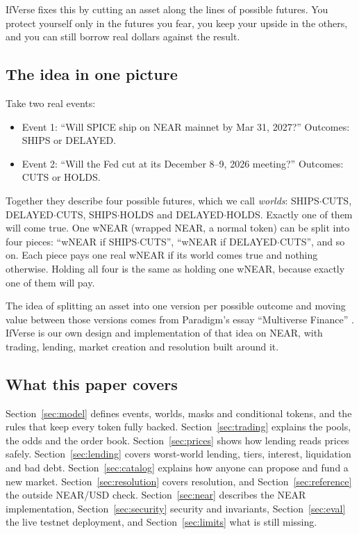 \documentclass[11pt,a4paper]{article}
\newcommand{\wSC}{\textsf{SHIPS$\cdot$CUTS}}
\newcommand{\wDC}{\textsf{DELAYED$\cdot$CUTS}}
\newcommand{\wSH}{\textsf{SHIPS$\cdot$HOLDS}}
\newcommand{\wDH}{\textsf{DELAYED$\cdot$HOLDS}}
\begin{document}
IfVerse fixes this by cutting an asset along the lines of possible futures. You protect yourself only in the futures
you fear, you keep your upside in the others, and you can still borrow real dollars against the result.

\subsection{The idea in one picture}

Take two real events:
\begin{itemize}
  \item Event 1: ``Will SPICE ship on NEAR mainnet by Mar 31, 2027?'' Outcomes: \textsf{SHIPS} or \textsf{DELAYED}.
  \item Event 2: ``Will the Fed cut at its December 8--9, 2026 meeting?'' Outcomes: \textsf{CUTS} or \textsf{HOLDS}.
\end{itemize}
Together they describe four possible futures, which we call \emph{worlds}: \wSC, \wDC, \wSH{} and \wDH.
Exactly one of them will come true. One wNEAR (wrapped NEAR, a normal token) can be split into four pieces:
``wNEAR if \wSC'', ``wNEAR if \wDC'', and so on. Each piece pays one real wNEAR if its world comes true and
nothing otherwise. Holding all four is the same as holding one wNEAR, because exactly one of them will pay.

The idea of splitting an asset into one version per possible outcome and moving value between those versions comes
from Paradigm's essay ``Multiverse Finance'' \cite{white2025}. IfVerse is our own design and implementation of
that idea on NEAR, with trading, lending, market creation and resolution built around it.

\subsection{What this paper covers}

Section~\ref{sec:model} defines events, worlds, masks and conditional tokens, and the rules that keep every token
fully backed. Section~\ref{sec:trading} explains the pools, the odds and the order book. Section~\ref{sec:prices}
shows how lending reads prices safely. Section~\ref{sec:lending} covers worst-world lending, tiers, interest,
liquidation and bad debt. Section~\ref{sec:catalog} explains how anyone can propose and fund a new market.
Section~\ref{sec:resolution} covers resolution, and Section~\ref{sec:reference} the outside NEAR/USD check.
Section~\ref{sec:near} describes the NEAR implementation, Section~\ref{sec:security} security and invariants,
Section~\ref{sec:eval} the live testnet deployment, and Section~\ref{sec:limits} what is still missing.
\end{document}
